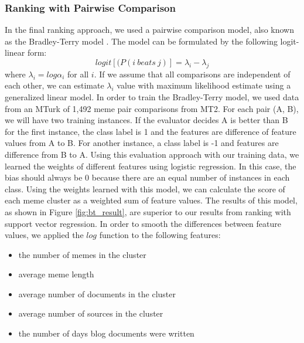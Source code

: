 \documentclass{sig-alternate}
\begin{document}
\subsubsection{Ranking with Pairwise Comparison}
In the final ranking approach, we used a pairwise comparison model, also known as the Bradley-Terry model \cite{Bradley1952}. The model can be formulated by the following logit-linear form:
\begin{displaymath}
 logit[(P(i\ beats\ j)]=\lambda_i - \lambda_j
\end{displaymath}
where $\lambda_i=log\alpha_i$ for all $i$. If we assume that all comparisons are independent of each other, we can estimate $\lambda_i$ value with maximum likelihood estimate using a generalized linear model. In order to train the Bradley-Terry model, we used data from an MTurk of 1,492 meme pair comparisons from MT2. For each pair (A, B), we will have two training instances. If the evaluator decides A is better than B for the first instance, the class label is 1 and the features are difference of feature values from A to B. For another instance, a class label is -1 and features are difference from B to A. Using this evaluation approach with our training data, we learned the weights of different features using logistic regression. In this case, the bias should always be 0 because there are an equal number of instances in each class. Using the weights learned with this model, we can calculate the score of each meme cluster as a weighted sum of feature values. The results of this model, as shown in Figure \ref{fig:bt_result}, are superior to our results from ranking with support vector regression. In order to smooth the differences between feature values, we applied the $log$ function to the following features:

\begin{itemize}
 \item the number of memes in the cluster
 \item average meme length
 \item average number of documents in the cluster
 \item average number of sources in the cluster
 \item the number of days blog documents were written
\end{itemize}
\end{document}
